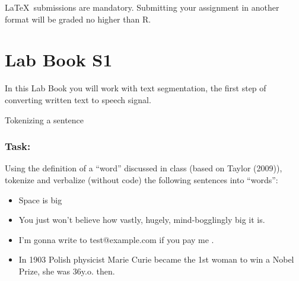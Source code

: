 \documentclass{../labbook}
\begin{document}
\begin{mdframed}[backgroundcolor=blue!20]
\LaTeX ~submissions are mandatory. Submitting your assignment in another format will be graded no higher than R.
\end{mdframed}

\section{Lab Book S1}
In this Lab Book you will work with text segmentation, the first step of converting written text to speech signal.

\begin{problem}{1}{3}{Tokenizing a sentence}

\subsubsection*{Task:}
Using the definition of a ``word'' discussed in class (based on Taylor (2009)), tokenize and verbalize (without code) the following sentences into ``words'':
\begin{itemize}
    \item Space is big
    \item You just won't believe how vastly, hugely, mind-bogglingly big it is.
    \item I'm gonna write to test@example.com if you pay me .
    \item In 1903 Polish physicist Marie Curie became the 1st woman to win a Nobel Prize, she was 36y.o. then.
\end{itemize}
\end{problem}
\end{document}
